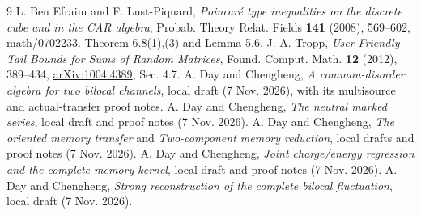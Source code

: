 \documentclass[11pt]{article}
\begin{document}
\begin{thebibliography}{9}\setlength{\itemsep}{2pt}
 L. Ben Efraim and F. Lust-Piquard,
\emph{Poincar\'e type inequalities on the discrete cube and in the
CAR algebra}, Probab. Theory Relat. Fields \textbf{141} (2008),
569--602, \href{https://arxiv.org/abs/math/0702233}{math/0702233}.
Theorem 6.8(1),(3) and Lemma 5.6.
 J. A. Tropp,
\emph{User-Friendly Tail Bounds for Sums of Random Matrices},
Found. Comput. Math. \textbf{12} (2012), 389--434,
\href{https://arxiv.org/abs/1004.4389}{arXiv:1004.4389}, Sec. 4.7.
 A. Day and Chengheng, \emph{A common-disorder algebra
for two bilocal channels}, local draft (7 Nov. 2026), with its
multisource and actual-transfer proof notes.
 A. Day and Chengheng, \emph{The neutral marked
series}, local draft and proof notes (7 Nov. 2026).
 A. Day and Chengheng, \emph{The oriented memory
transfer} and \emph{Two-component memory reduction}, local drafts
and proof notes (7 Nov. 2026).
 A. Day and Chengheng, \emph{Joint charge/energy
regression and the complete memory kernel}, local draft and proof
notes (7 Nov. 2026).
 A. Day and Chengheng, \emph{Strong reconstruction
of the complete bilocal fluctuation}, local draft (7 Nov. 2026).
\end{thebibliography}
\end{document}
